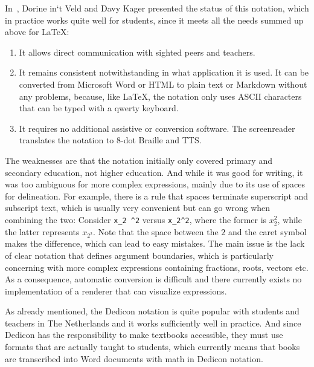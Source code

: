 \documentclass{easychair}
\begin{document}
In~\cite{Dorine16}, Dorine in‘t Veld and Davy Kager presented the status of this
notation, which in practice works quite well for students, since it meets all
the needs summed up above for {\LaTeX}:
\begin{enumerate}
\item It allows direct communication with sighted peers and teachers.
\item It remains consistent notwithstanding in what application it is used. It
  can be converted from Microsoft Word or HTML to plain text or Markdown without
  any problems, because, like {\LaTeX}, the notation only uses ASCII characters
  that can be typed with a qwerty keyboard.
\item It requires no additional assistive or conversion software. The
  screenreader translates the notation to 8-dot Braille and TTS.
\end{enumerate}



The weaknesses are that the notation initially only covered primary and
secondary education, not higher education. And while it was good for writing, it
was too ambiguous for more complex expressions, mainly due to its use of spaces
for delineation. For example, there is a rule that spaces terminate superscript
and subscript text, which is usually very convenient but can go wrong when
combining the two: Consider \verb+x_2 ^2+ versus \verb+x_2^2+, where the former
is $x_2^2$, while the latter represents $x_{2^2}$. Note that the space between the
$2$ and the caret symbol makes the difference, which can lead to easy mistakes.
The main issue is the lack of clear notation that defines argument boundaries,
which is particularly concerning with more complex expressions containing
fractions, roots, vectors etc.  As a consequence, automatic conversion is
difficult and there currently exists no implementation of a renderer that can
visualize expressions.

As already mentioned, the Dedicon notation is quite popular with students and
teachers in The Netherlands and it works sufficiently well in practice. And
since Dedicon has the responsibility to make textbooks accessible, they must use
formats that are actually taught to students, which currently means that books
are transcribed into Word documents with math in Dedicon notation.
\end{document}
